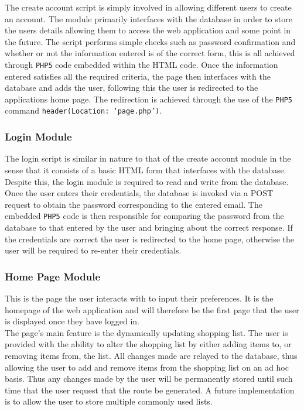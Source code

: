 \documentclass[10pt,twocolumn]{witseiepaper}
\begin{document}
		The create account script is simply involved in allowing different users to create an account. The module primarily interfaces with the database in order to store the users details allowing them to access the web application and some point in the future. The script performs simple checks such as password confirmation and whether or not the information entered is of the correct form, this is all achieved through \texttt{PHP5} code embedded within the HTML code. Once the information entered satisfies all the required criteria, the page then interfaces with the database and adds the user, following this the user is redirected to the applications home page. The redirection is achieved through the use of the \texttt{PHP5} command \texttt{header(Location: `page.php')}. 
		
		\subsubsection{Login Module}
		
		The login script is similar in nature to that of the create account module in the sense that it consists of a basic HTML form that interfaces with the database. Despite this, the login module is required to read and write from the database. \\
		
		Once the user enters their credentials, the database is invoked via a POST request to obtain the password corresponding to the entered email. The embedded \texttt{PHP5} code is then responsible for comparing the password from the database to that entered by the user and bringing about the correct response. If the credentials are correct the user is redirected to the home page, otherwise the user will be required to re-enter their credentials.
		
		\subsubsection{Home Page Module}
		
		This is the page the user interacts with to input their preferences. It is the homepage of the web application and will therefore be the first page that the user is displayed once they have logged in.\\
		
		The page's main feature is the dynamically updating shopping list. The user is provided with the ability to alter the shopping list by either adding items to, or removing items from, the list. All changes made are relayed to the database, thus allowing the user to add and remove items from the shopping list on an ad hoc basis. Thus any changes made by the user will be permanently stored until such time that the user request that the route be generated. A future implementation is to allow the user to store multiple commonly used lists. \\
		
\end{document}
